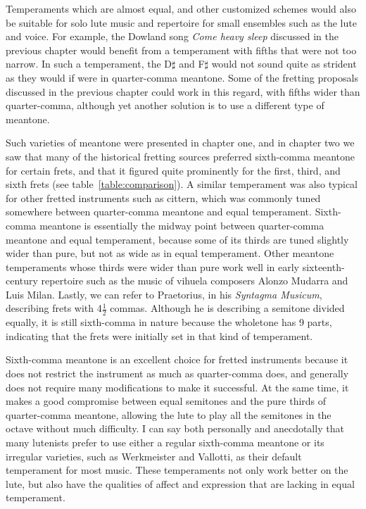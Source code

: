 Temperaments which are almost equal, and other customized schemes would also
be suitable for solo lute music and repertoire for small ensembles such as
the lute and voice. For example, the Dowland song \textit{Come heavy sleep} discussed in
the previous chapter would benefit from a temperament with fifths that were not too
narrow.  In such a temperament,  the D$\sharp$ and F$\sharp$ would not sound quite
as strident as they would if were in quarter-comma meantone. Some of the
fretting proposals discussed in the previous chapter could work in this regard,
with fifths wider than quarter-comma, although yet another solution is to use a
different type of meantone.

Such varieties of meantone were presented in chapter one, and in chapter two we saw that many of the
historical fretting sources preferred sixth-comma meantone for certain frets, and that it figured
quite prominently for the first, third, and sixth frets (see table~\ref{table:comparison}). A
similar temperament was also typical for other fretted instruments such as cittern, which was
commonly tuned somewhere between quarter-comma meantone and equal temperament. \autocite[12]{PF:1}
Sixth-comma meantone is essentially the midway point between quarter-comma meantone and equal
temperament, because some of its thirds are tuned slightly wider than pure, but not as wide as in
equal temperament. Other meantone temperaments whose thirds were wider than pure work well in early
sixteenth-century repertoire such as the music of vihuela composers Alonzo Mudarra and Luis
Milan.\autocite[56]{WH:1} Lastly, we can refer to Praetorius, in his \textit{Syntagma Musicum},
describing frets with 4$ \frac{1}{2} $ commas.\autocite[68]{MP:1} Although he is describing a
semitone divided equally, it is still sixth-comma in nature because the wholetone has 9 parts,
indicating that the frets were initially set in that kind of temperament.

Sixth-comma meantone is an excellent choice for fretted instruments because it does not restrict the
instrument as much as quarter-comma does, and generally does not require many modifications to make
it successful. At the same time, it makes a good compromise between equal semitones and the pure
thirds of quarter-comma meantone, allowing the lute to play all the semitones in the octave without
much difficulty. I can say both personally and anecdotally that many lutenists prefer to use
either a regular sixth-comma meantone or its irregular varieties, such as Werkmeister and
Vallotti, as their default temperament for most music. These temperaments not only work better on
the lute, but also have the qualities of affect and expression that are lacking in equal
temperament.

